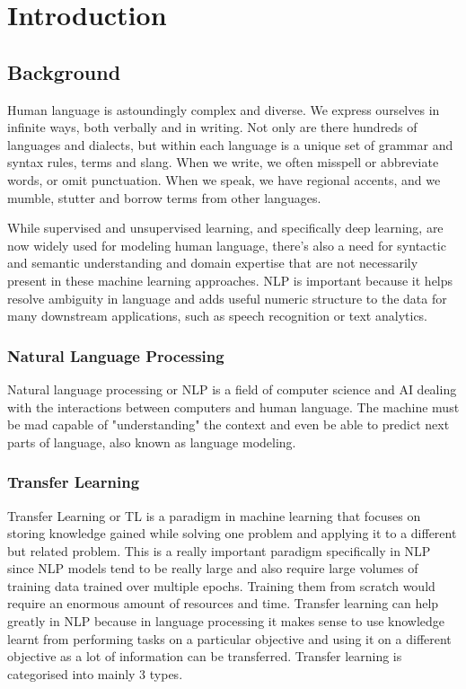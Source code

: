 \chapter{Introduction} 
\label{Chapter1} 
\section{Background}
Human language is astoundingly complex and diverse. We express ourselves in infinite ways, both verbally and in writing. Not only are there hundreds of languages and dialects, but within each language is a unique set of grammar and syntax rules, terms and slang. When we write, we often misspell or abbreviate words, or omit punctuation. When we speak, we have regional accents, and we mumble, stutter and borrow terms from other languages.

While supervised and unsupervised learning, and specifically deep learning, are now widely used for modeling human language, there’s also a need for syntactic and semantic understanding and domain expertise that are not necessarily present in these machine learning approaches. NLP is important because it helps resolve ambiguity in language and adds useful numeric structure to the data for many downstream applications, such as speech recognition or text analytics.\cite{Typesoftransferlearning}

\subsection{Natural Language Processing}
Natural language processing or NLP is a field of computer science and AI dealing with the interactions between computers and human language. The machine must be mad capable of "understanding" the context and even be able to predict next parts of language, also known as language modeling.


\subsection{Transfer Learning}
Transfer Learning or TL is a paradigm in machine learning that focuses on storing knowledge gained while solving one problem and applying it to a different but related problem. This is a really important paradigm specifically in NLP since NLP models tend to be really large and also require large volumes of training data trained over multiple epochs. Training them from scratch would require an enormous amount of resources and time. Transfer learning can help greatly in NLP because in language processing it makes sense to use knowledge learnt from performing tasks on a particular objective and using it on a different objective as a lot of information can be transferred. Transfer learning is categorised into mainly 3 types.

